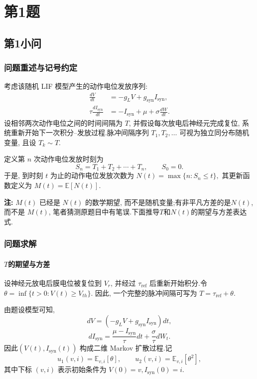 ﻿\documentclass[UTF8,  zihao=-4]{ctexart}
\begin{document}
\section{第1题}
\subsection{第1小问}
\subsubsection{问题重述与记号约定}
考虑该随机 LIF 模型产生的动作电位发放序列:
\begin{equation}
\label{eq:q1_LIF}
\begin{aligned}
\frac{dV}{dt} &= -g_L V + g_{\mathrm{syn}} I_{\mathrm{syn}},  \\
\tau \frac{d I_{\mathrm{syn}}}{dt}
&= -I_{\mathrm{syn}} + \mu + \sigma \frac{dW}{dt}.
\end{aligned}
\end{equation}
设相邻两次动作电位之间的时间间隔为 \(T\), 并假设每次放电后神经元完成复位, 系统重新开始下一次积分--发放过程.脉冲间隔序列 \(T_1,  T_2, \ldots\) 可视为独立同分布随机变量, 且设 \(T_k\sim T\).

定义第 \(n\) 次动作电位发放时刻为
\[
S_n=T_1+T_2+\cdots+T_n, \qquad S_0=0.
\]
于是, 到时刻 \(t\) 为止的动作电位发放次数为
$
N(t)=\max\{n: S_n\leq t\}, 
$
其更新函数定义为
$
M(t)=\mathbb{E}[N(t)].
$

\textbf{注:} \(M(t)\) 已经是 \(N(t)\) 的数学期望, 而不是随机变量;有非平凡方差的是\(N(t)\), 而不是 \(M(t)\),  笔者猜测原题目中有笔误.下面推导$T$和\(N(t)\)的期望与方差表达式.

\subsubsection{问题求解}
\label{sec1:solve}
\paragraph{\texorpdfstring{\(T\)的期望与方差}{T 的期望与方差}}

设神经元放电后膜电位被复位到
\(V_r\), 并经过 \(\tau_{\mathrm{ref}}\) 后重新开始积分.令
$\theta=
\inf\{t>0: V(t)\geq V_{th} \}.
$
因此, 一个完整的脉冲间隔可写为
$
T=\tau_{\mathrm{ref}}+\theta .
$

由题设模型可知, 
\[
dV
=
\left(-g_LV+g_{\mathrm{syn}}I_{\mathrm{syn}}\right)dt, 
\]
\[
dI_{\mathrm{syn}}
=
\frac{\mu-I_{\mathrm{syn}}}{\tau}dt
+
\frac{\sigma}{\tau}dW_t .
\]
因此\((V(t),  I_{\mathrm{syn}}(t))\) 构成二维 Markov 扩散过程.记
\[
u_1(v,  i)
=
\mathbb{E}_{v,  i}[\theta], 
\qquad
u_2(v,  i)
=
\mathbb{E}_{v,  i}[\theta^2], 
\]
其中下标 \((v,  i)\) 表示初始条件为
$V(0)=v,  I_{\mathrm{syn}}(0)=i.
$
\end{document}
